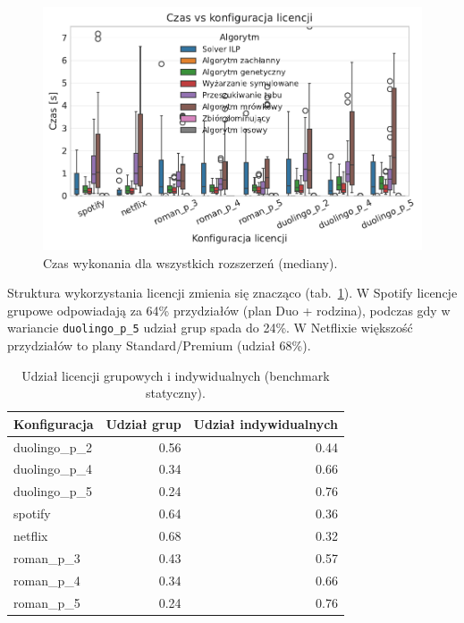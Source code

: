 \begin{figure}[H]
  \centering
  \includegraphics[width=0.6\linewidth]{assets/figures/extensions/static/time_by_license_all_algos.pdf}
  \caption{Czas wykonania dla wszystkich rozszerzeń (mediany).}
  \label{fig:ext-license-time}
\end{figure}

Struktura wykorzystania licencji zmienia się znacząco (tab.~\ref{tab:ext-license-mix}). W Spotify licencje grupowe odpowiadają za 64\% przydziałów (plan Duo + rodzina), podczas gdy w wariancie \texttt{duolingo\_p\_5} udział grup spada do 24\%. W Netflixie większość przydziałów to plany Standard/Premium (udział 68\%).

\begin{table}[H]
  \centering
  \caption{Udział licencji grupowych i indywidualnych (benchmark statyczny).}
  \label{tab:ext-license-mix}
  \begin{tabular}{lrr}
    \toprule
    \textbf{Konfiguracja} & \textbf{Udział grup} & \textbf{Udział indywidualnych} \\
    \midrule
    duolingo\_p\_2        & 0.56                 & 0.44                           \\
    duolingo\_p\_4        & 0.34                 & 0.66                           \\
    duolingo\_p\_5        & 0.24                 & 0.76                           \\
    spotify               & 0.64                 & 0.36                           \\
    netflix               & 0.68                 & 0.32                           \\
    roman\_p\_3           & 0.43                 & 0.57                           \\
    roman\_p\_4           & 0.34                 & 0.66                           \\
    roman\_p\_5           & 0.24                 & 0.76                           \\
  \end{tabular}
\end{table}


